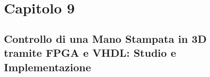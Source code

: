 \chapter{Capitolo 9}
\section{Controllo di una Mano Stampata in 3D tramite FPGA e VHDL: Studio e Implementazione}
